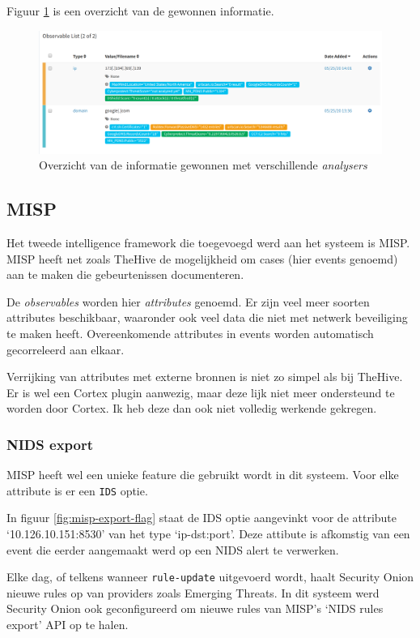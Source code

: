 \documentclass[a4paper,12pt]{report}
\begin{document}
Figuur \ref{fig:thehive-example} is een overzicht van de gewonnen informatie.

\begin{figure}[H]
  \centering
  \includegraphics[width=\textwidth]{thehive-example}
  \caption{Overzicht van de informatie gewonnen met verschillende \emph{analysers}}
  \label{fig:thehive-example}
\end{figure}

\subsection{MISP}
Het tweede intelligence framework die toegevoegd werd aan het systeem is MISP.
MISP heeft net zoals TheHive de mogelijkheid om cases (hier events genoemd) aan te maken die gebeurtenissen documenteren.

De \emph{observables} worden hier \emph{attributes} genoemd.
Er zijn veel meer soorten attributes beschikbaar, waaronder ook veel data die niet met netwerk beveiliging te maken heeft.
Overeenkomende attributes in events worden automatisch gecorreleerd aan elkaar.

Verrijking van attributes met externe bronnen is niet zo simpel als bij TheHive.
Er is wel een Cortex plugin aanwezig, maar deze lijk niet meer ondersteund te worden door Cortex.
Ik heb deze dan ook niet volledig werkende gekregen.

\subsubsection{NIDS export}
\label{sec:misp-nids-export}
MISP heeft wel een unieke feature die gebruikt wordt in dit systeem.
Voor elke attribute is er een \lstinline|IDS| optie.

In figuur \ref{fig:misp-export-flag} staat de IDS optie aangevinkt voor de attribute `10.126.10.151:8530' van het type `ip-dst:port'.
Deze attibute is afkomstig van een event die eerder aangemaakt werd op een NIDS alert te verwerken.

Elke dag, of telkens wanneer \lstinline|rule-update| uitgevoerd wordt, haalt Security Onion nieuwe rules op van providers zoals Emerging Threats.
In dit systeem werd Security Onion ook geconfigureerd om nieuwe rules van MISP's `NIDS rules export' API op te halen.
\end{document}

